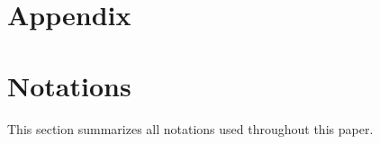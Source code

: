 \section*{Appendix}


\section{Notations}\label{sec:notation}

This section summarizes all notations used throughout this paper. 

